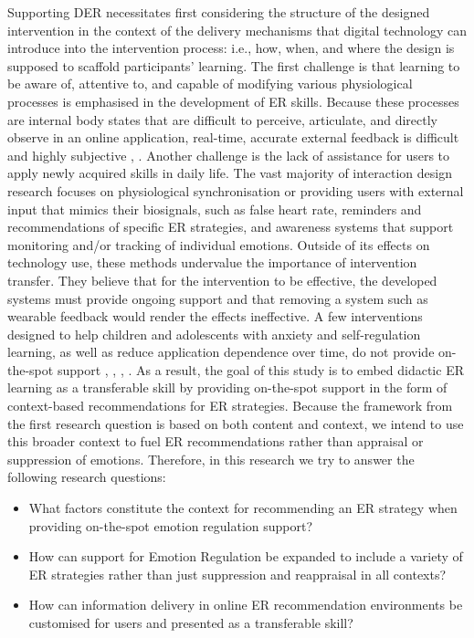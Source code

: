 Supporting DER necessitates first considering the structure of the designed intervention in the context of the delivery mechanisms that digital technology can introduce into the intervention process: i.e., how, when, and where the design is supposed to scaffold participants' learning. The first challenge is that learning to be aware of, attentive to, and capable of modifying various physiological processes is emphasised in the development of ER skills. Because these processes are internal body states that are difficult to perceive, articulate, and directly observe in an online application, real-time, accurate external feedback is difficult and highly subjective \cite{slovak2022designing}, \cite{tag2022emotion}. Another challenge is the lack of assistance for users to apply newly acquired skills in daily life. The vast majority of interaction design research focuses on physiological synchronisation or providing users with external input that mimics their biosignals, such as false heart rate, reminders and recommendations of specific ER strategies, and awareness systems that support monitoring and/or tracking of individual emotions. Outside of its effects on technology use, these methods undervalue the importance of intervention transfer. They believe that for the intervention to be effective, the developed systems must provide ongoing support and that removing a system such as wearable feedback would render the effects ineffective. A few interventions designed to help children and adolescents with anxiety and self-regulation learning, as well as reduce application dependence over time, do not provide on-the-spot support \cite{antle2018opening}, \cite{antle2019design}, \cite{scholten2016randomized}, \cite{slovak2016scaffolding}. As a result, the goal of this study is to embed didactic ER learning as a transferable skill by providing on-the-spot support in the form of context-based recommendations for ER strategies. Because the framework from the first research question is based on both content and context, we intend to use this broader context to fuel ER recommendations rather than appraisal or suppression of emotions. Therefore, in this research we try to answer the following research questions:
\begin{itemize}
    \item What factors constitute the context for recommending an ER strategy when providing on-the-spot emotion regulation support?
    \item How can support for Emotion Regulation be expanded to include a variety of ER strategies rather than just suppression and reappraisal in all contexts?
    \item How can information delivery in online ER recommendation environments be customised for users and presented as a transferable skill?
\end{itemize}

